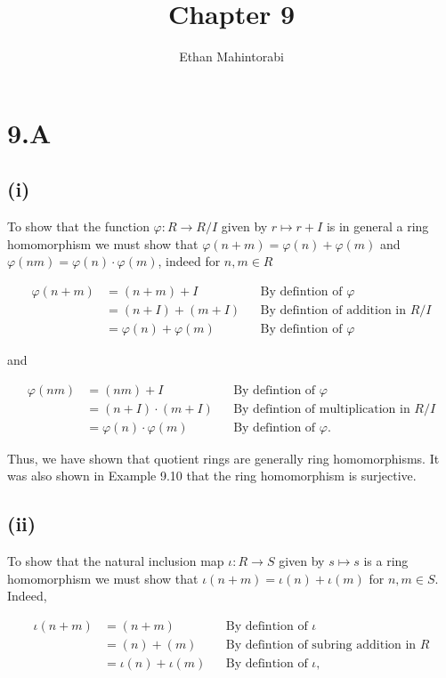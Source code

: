 \documentclass{article}
\begin{document}
  
  \title{Chapter 9}
  \author{Ethan Mahintorabi}
  
  \maketitle

  \section*{9.A}
    \subsection*{(i)}
      To show that the function $\varphi:R \rightarrow R/I$ given by $r \mapsto r + I$ is in general a ring homomorphism we must show that $\varphi(n + m) = \varphi(n) + \varphi(m)$ and $\varphi(nm) = \varphi(n) \cdot \varphi(m)$, indeed for $n,m \in R$

      \begin{align*}
        \varphi(n + m) &= (n+m) + I  && \text{By defintion of } \varphi \\
        &= (n + I) + (m + I) && \text{By defintion of addition in } R/I\\
        &= \varphi(n) + \varphi(m) && \text{By defintion of } \varphi
      \end{align*}

      \noindent and

      \begin{align*}
        \varphi(nm) &= (nm) + I  && \text{By defintion of } \varphi \\
        &= (n + I) \cdot (m + I) && \text{By defintion of multiplication in } R/I\\
        &= \varphi(n) \cdot \varphi(m) && \text{By defintion of } \varphi.
      \end{align*}


      Thus, we have shown that quotient rings are generally ring homomorphisms. It was also shown in Example 9.10 that the ring homomorphism is surjective.

    \subsection*{(ii)}
      To show that the natural inclusion map $\iota: R \rightarrow S$ given by $s \mapsto s$ is a ring homomorphism we must show that $\iota(n + m) = \iota(n) + \iota(m)$ for $n,m \in S$. Indeed,

      \begin{align*}
        \iota(n + m) &= (n + m)  && \text{By defintion of } \iota \\
        &=  (n) + (m) && \text{By defintion of subring addition in } R\\
        &= \iota(n) + \iota(m) && \text{By defintion of } \iota,
      \end{align*}
\end{document}
